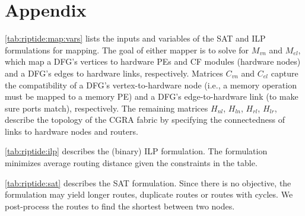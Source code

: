 \onecolumn
\appendix
\section{Appendix}
\label{sec:appendix}

\tabRipTideMapVars
\autoref{tab:riptide:map:vars} lists the inputs and variables of the SAT and ILP formulations for mapping.
% 
The goal of either mapper is to solve for $M_{vn}$ and $M_{el}$, which map a DFG's vertices to hardware PEs and CF modules (hardware nodes) and a DFG's edges to hardware links, respectively.
% 
Matrices $C_{vn}$ and $C_{el}$ capture the compatibility of a DFG's vertex-to-hardware node (i.e., a memory operation must be mapped to a memory PE) and a DFG's edge-to-hardware link (to make sure ports match), respectively.
% 
The remaining matrices $H_{nl}$, $H_{ln}$, $H_{rl}$, $H_{lr}$, describe the topology of the CGRA fabric by specifying the connectedness of links to hardware nodes and routers.

\tabRipTideILP
\autoref{tab:riptide:ilp} describes the (binary) ILP formulation.
% 
The formulation minimizes average routing distance given the constraints in the table.

\tabRipTideSAT
\autoref{tab:riptide:sat} describes the SAT formulation.
% 
Since there is no objective, the formulation may yield longer routes, duplicate routes or routes with cycles.
% 
We post-process the routes to find the shortest between two nodes.
